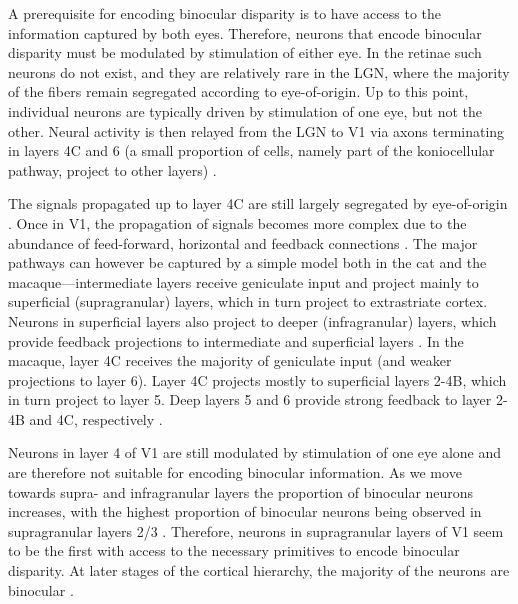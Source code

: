 A prerequisite for encoding binocular disparity is to have access to the information captured by both eyes. Therefore, neurons that encode binocular disparity must be modulated by stimulation of either eye. In the retinae such neurons do not exist, and they are relatively rare in the LGN, where the majority of the fibers remain segregated according to eye-of-origin. Up to this point, individual neurons are typically driven by stimulation of one eye, but not the other. Neural activity is then relayed from the LGN to V1 via axons terminating in layers 4C and 6 (a small proportion of cells, namely part of the koniocellular pathway, project to other layers) \cite{Nassi:2009hd}.

The signals propagated up to layer 4C are still largely segregated by eye-of-origin \cite{Hubel:1968hz}. Once in V1, the propagation of signals becomes more complex due to the abundance of feed-forward, horizontal and feedback connections \cite{Callaway1998, Nassi:2009hd, Harris:2013vn}. The major pathways can however be captured by a simple model both in the cat and the macaque---intermediate layers receive geniculate input and project mainly to superficial (supragranular) layers, which in turn project to extrastriate cortex. Neurons in superficial layers also project to deeper (infragranular) layers, which provide feedback projections to intermediate and superficial layers \cite{Callaway1998}. In the macaque, layer 4C receives the majority of geniculate input (and weaker projections to layer 6). Layer 4C projects mostly to superficial layers 2-4B, which in turn project to layer 5. Deep layers 5 and 6 provide strong feedback to layer 2-4B and 4C, respectively \cite{Callaway1998}.

Neurons in layer 4 of V1 are still modulated by stimulation of one eye alone \cite{Hubel:1968hz} and are therefore not suitable for encoding binocular information. As we move towards supra- and infragranular layers the proportion of binocular neurons increases, with the highest proportion of binocular neurons being observed in supragranular layers 2/3 \cite{Hubel:1968hz, Poggio1972}. Therefore, neurons in supragranular layers of V1 seem to be the first with access to the necessary primitives to encode binocular disparity. At later stages of the cortical hierarchy, the majority of the neurons are binocular \cite{Burkhalter:1986fk, Maunsell:1987vn}.



